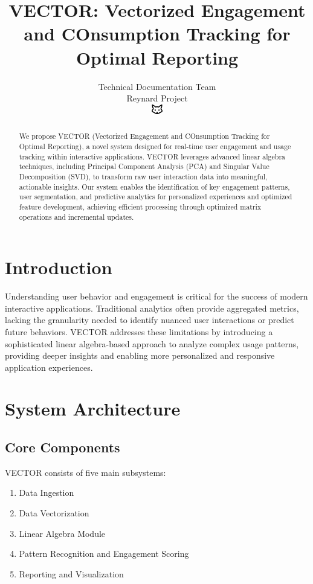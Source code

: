 \documentclass[10pt]{article}
\begin{document}
\title{VECTOR: Vectorized Engagement and COnsumption Tracking for Optimal Reporting}

\author{Technical Documentation Team\\
Reynard Project\\
\includegraphics[width=0.5cm]{../../shared-assets/favicon.pdf}}

\maketitle

\begin{abstract}
We propose VECTOR (Vectorized Engagement and COnsumption Tracking for Optimal Reporting), a novel system designed for real-time user engagement and usage tracking within interactive applications. VECTOR leverages advanced linear algebra techniques, including Principal Component Analysis (PCA) and Singular Value Decomposition (SVD), to transform raw user interaction data into meaningful, actionable insights. Our system enables the identification of key engagement patterns, user segmentation, and predictive analytics for personalized experiences and optimized feature development, achieving efficient processing through optimized matrix operations and incremental updates.
\end{abstract}

\section{Introduction}
Understanding user behavior and engagement is critical for the success of modern interactive applications. Traditional analytics often provide aggregated metrics, lacking the granularity needed to identify nuanced user interactions or predict future behaviors. VECTOR addresses these limitations by introducing a sophisticated linear algebra-based approach to analyze complex usage patterns, providing deeper insights and enabling more personalized and responsive application experiences.

\section{System Architecture}
\subsection{Core Components}
VECTOR consists of five main subsystems:
\begin{enumerate}
    \item Data Ingestion
    \item Data Vectorization
    \item Linear Algebra Module
    \item Pattern Recognition and Engagement Scoring
    \item Reporting and Visualization
\end{enumerate}
\end{document}
